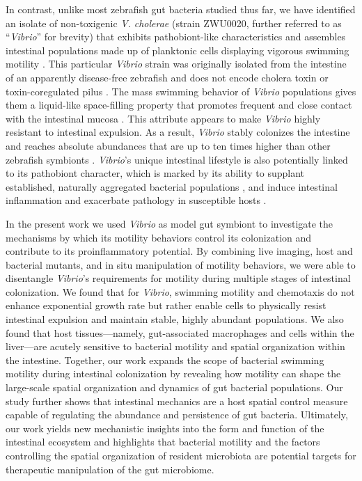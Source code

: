In contrast, unlike most zebrafish gut bacteria studied thus far, we have identified an isolate of non-toxigenic \textit{V. }\textit{cholerae} (strain ZWU0020, further referred to as ``\textit{Vibrio}'' for brevity) that exhibits pathobiont-like characteristics and assembles intestinal populations made up of planktonic cells displaying vigorous swimming motility \cite{wiles_host_2016,rolig_enteric_2017}. This particular \textit{Vibrio} strain was originally isolated from the intestine of an apparently disease-free zebrafish and does not encode cholera toxin or toxin-coregulated pilus \cite{stephens_composition_2016}. The mass swimming behavior of \textit{Vibrio} populations gives them a liquid-like space-filling property that promotes frequent and close contact with the intestinal mucosa \cite{wiles_host_2016}. This attribute appears to make \textit{Vibrio} highly resistant to intestinal expulsion. As a result, \textit{Vibrio} stably colonizes the intestine and reaches absolute abundances that are up to ten times higher than other zebrafish symbionts \cite{schlomann_sublethal_2019}. \textit{Vibrio}'s unique intestinal lifestyle is also potentially linked to its pathobiont character, which is marked by its ability to supplant established, naturally aggregated bacterial populations \cite{wiles_host_2016}, and induce intestinal inflammation and exacerbate pathology in susceptible hosts \cite{rolig_enteric_2017,rolig_individual_2015}. 

In the present work we used \textit{Vibrio} as model gut symbiont to investigate the mechanisms by which its motility behaviors control its colonization and contribute to its proinflammatory potential. By combining live imaging, host and bacterial mutants, and in situ manipulation of motility behaviors, we were able to disentangle \textit{Vibrio}'s requirements for motility during multiple stages of intestinal colonization. We found that for \textit{Vibrio}, swimming motility and chemotaxis do not enhance exponential growth rate but rather enable cells to physically resist intestinal expulsion and maintain stable, highly abundant populations. We also found that host tissues—namely, gut-associated macrophages and cells within the liver—are acutely sensitive to bacterial motility and spatial organization within the intestine. Together, our work expands the scope of bacterial swimming motility during intestinal colonization by revealing how motility can shape the large-scale spatial organization and dynamics of gut bacterial populations. Our study further shows that intestinal mechanics are a host spatial control measure capable of regulating the abundance and persistence of gut bacteria. Ultimately, our work yields new mechanistic insights into the form and function of the intestinal ecosystem and highlights that bacterial motility and the factors controlling the spatial organization of resident microbiota are potential targets for therapeutic manipulation of the gut microbiome.

